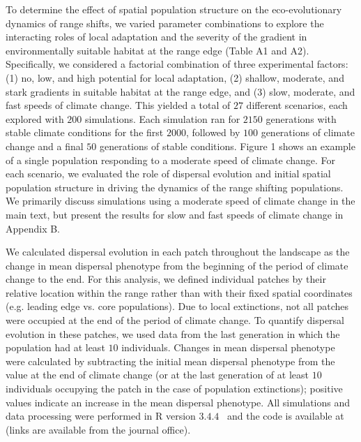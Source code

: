 \documentclass[11pt]{article}
\begin{document}
To determine the effect of spatial population structure on the eco-evolutionary dynamics of range shifts, we varied parameter combinations to explore the interacting roles of local adaptation and the severity of the gradient in environmentally suitable habitat at the range edge (Table A1 and A2). Specifically, we considered a factorial combination of three experimental factors: (1) no, low, and high potential for local adaptation, (2) shallow, moderate, and stark gradients in suitable habitat at the range edge, and (3) slow, moderate, and fast speeds of climate change. This yielded a total of $27$ different scenarios, each explored with $200$ simulations. Each simulation ran for $2150$ generations with stable climate conditions for the first $2000$, followed by $100$ generations of climate change and a final $50$ generations of stable conditions. Figure 1 shows an example of a single population responding to a moderate speed of climate change. For each scenario, we evaluated the role of dispersal evolution and initial spatial population structure in driving the dynamics of the range shifting populations. We primarily discuss simulations using a moderate speed of climate change in the main text, but present the results for slow and fast speeds of climate change in Appendix B.

We calculated dispersal evolution in each patch throughout the landscape as the change in mean dispersal phenotype from the beginning of the period of climate change to the end. For this analysis, we defined individual patches by their relative location within the range rather than with their fixed spatial coordinates (e.g. leading edge vs. core populations). Due to local extinctions, not all patches were occupied at the end of the period of climate change. To quantify dispersal evolution in these patches, we used data from the last generation in which the population had at least $10$ individuals. Changes in mean dispersal phenotype were calculated by subtracting the initial mean dispersal phenotype from the value at the end of climate change (or at the last generation of at least $10$ individuals occupying the patch in the case of population extinctions); positive values indicate an increase in the mean dispersal phenotype. All simulations and data processing were performed in R version $3.4.4$~\citep{team2000r} and the code is available at (links are available from the journal office).
\end{document}
